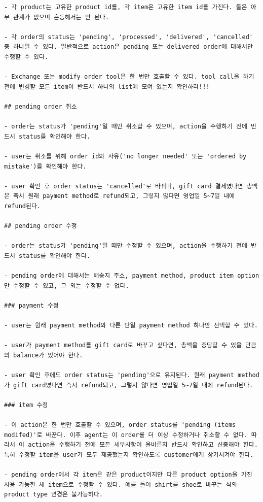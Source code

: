 \begin{verbatim}
- 각 product는 고유한 product id를, 각 item은 고유한 item id를 가진다. 둘은 아무 관계가 없으며 혼동해서는 안 된다.

- 각 order의 status는 'pending', 'processed', 'delivered', 'cancelled' 중 하나일 수 있다. 일반적으로 action은 pending 또는 delivered order에 대해서만 수행할 수 있다.

- Exchange 또는 modify order tool은 한 번만 호출할 수 있다. tool call을 하기 전에 변경할 모든 item이 반드시 하나의 list에 모여 있는지 확인하라!!!

## pending order 취소

- order는 status가 'pending'일 때만 취소할 수 있으며, action을 수행하기 전에 반드시 status를 확인해야 한다.

- user는 취소를 위해 order id와 사유('no longer needed' 또는 'ordered by mistake')를 확인해야 한다.

- user 확인 후 order status는 'cancelled'로 바뀌며, gift card 결제였다면 총액은 즉시 원래 payment method로 refund되고, 그렇지 않다면 영업일 5~7일 내에 refund된다.

## pending order 수정

- order는 status가 'pending'일 때만 수정할 수 있으며, action을 수행하기 전에 반드시 status를 확인해야 한다.

- pending order에 대해서는 배송지 주소, payment method, product item option만 수정할 수 있고, 그 외는 수정할 수 없다.

### payment 수정

- user는 원래 payment method와 다른 단일 payment method 하나만 선택할 수 있다.

- user가 payment method를 gift card로 바꾸고 싶다면, 총액을 충당할 수 있을 만큼의 balance가 있어야 한다.

- user 확인 후에도 order status는 'pending'으로 유지된다. 원래 payment method가 gift card였다면 즉시 refund되고, 그렇지 않다면 영업일 5~7일 내에 refund된다.

### item 수정

- 이 action은 한 번만 호출할 수 있으며, order status를 'pending (items modifed)'로 바꾼다. 이후 agent는 이 order를 더 이상 수정하거나 취소할 수 없다. 따라서 이 action을 수행하기 전에 모든 세부사항이 올바른지 반드시 확인하고 신중해야 한다. 특히 수정할 item을 user가 모두 제공했는지 확인하도록 customer에게 상기시켜야 한다.

- pending order에서 각 item은 같은 product이지만 다른 product option을 가진 사용 가능한 새 item으로 수정할 수 있다. 예를 들어 shirt를 shoe로 바꾸는 식의 product type 변경은 불가능하다.


\end{verbatim}
